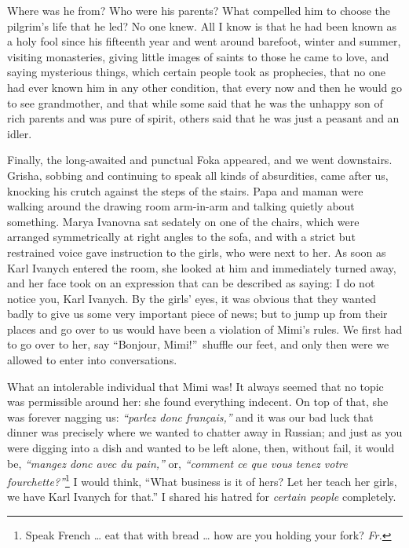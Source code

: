 Where was he from? Who were his parents? What compelled him to choose the pilgrim's life that he led? No one knew. All I know is that he had been known as a holy fool since his fifteenth year and went around barefoot, winter and summer, visiting monasteries, giving little images of saints to those he came to love, and saying mysterious things, which certain people took as prophecies, that no one had ever known him in any other condition, that every now and then he would go to see grandmother, and that while some said that he was the unhappy son of rich parents and was pure of spirit, others said that he was just a peasant and an idler.

Finally, the long-awaited and punctual Foka appeared, and we went downstairs. Grisha, sobbing and continuing to speak all kinds of absurdities, came after us, knocking his crutch against the steps of the stairs. Papa and maman were walking around the drawing room arm-in-arm and talking quietly about something. Marya Ivanovna sat sedately on one of the chairs, which were arranged symmetrically at right angles to the sofa, and with a strict but restrained voice gave instruction to the girls, who were next to her. As soon as Karl Ivanych entered the room, she looked at him and immediately turned away, and her face took on an expression that can be described as saying: I do not notice you, Karl Ivanych. By the girls' eyes, it was obvious that they wanted badly to give us some very important piece of news; but to jump up from their places and go over to us would have been a violation of Mimi's rules. We first had to go over to her, say ``Bonjour, Mimi!''~shuffle our feet, and only then were we allowed to enter into conversations.

What an intolerable individual that Mimi was! It always seemed that no topic was permissible around her: she found everything indecent. On top of that, she was forever nagging us: \textit{``parlez donc fran\c cais,''} and it was our bad luck that dinner was precisely where we wanted to chatter away in Russian; and just as you were digging into a dish and wanted to be left alone, then, without fail, it would be, \textit{``mangez donc avec du pain,''} or, \textit{``comment ce que vous tenez votre fourchette?''}\footnote{Speak French \ldots{} eat that with bread \ldots{} how are you holding your fork? \textit{Fr.}} I would think, ``What business is it of hers? Let her teach her girls, we have Karl Ivanych for that.'' I shared his hatred for \emph{certain people} completely. %

